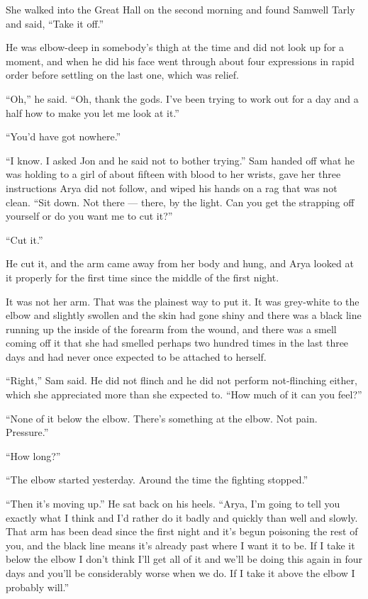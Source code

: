 She walked into the Great Hall on the second morning and found Samwell Tarly and said, “Take it off.”

He was elbow-deep in somebody’s thigh at the time and did not look up for a moment, and when he did his face went through about four expressions in rapid order before settling on the last one, which was relief.

“Oh,” he said. “Oh, thank the gods. I’ve been trying to work out for a day and a half how to make you let me look at it.”

“You’d have got nowhere.”

“I know. I asked Jon and he said not to bother trying.” Sam handed off what he was holding to a girl of about fifteen with blood to her wrists, gave her three instructions Arya did not follow, and wiped his hands on a rag that was not clean. “Sit down. Not there — there, by the light. Can you get the strapping off yourself or do you want me to cut it?”

“Cut it.”

He cut it, and the arm came away from her body and hung, and Arya looked at it properly for the first time since the middle of the first night.

It was not her arm. That was the plainest way to put it. It was grey-white to the elbow and slightly swollen and the skin had gone shiny and there was a black line running up the inside of the forearm from the wound, and there was a smell coming off it that she had smelled perhaps two hundred times in the last three days and had never once expected to be attached to herself.

“Right,” Sam said. He did not flinch and he did not perform not-flinching either, which she appreciated more than she expected to. “How much of it can you feel?”

“None of it below the elbow. There’s something at the elbow. Not pain. Pressure.”

“How long?”

“The elbow started yesterday. Around the time the fighting stopped.”

“Then it’s moving up.” He sat back on his heels. “Arya, I’m going to tell you exactly what I think and I’d rather do it badly and quickly than well and slowly. That arm has been dead since the first night and it’s begun poisoning the rest of you, and the black line means it’s already past where I want it to be. If I take it below the elbow I don’t think I’ll get all of it and we’ll be doing this again in four days and you’ll be considerably worse when we do. If I take it above the elbow I probably will.”

